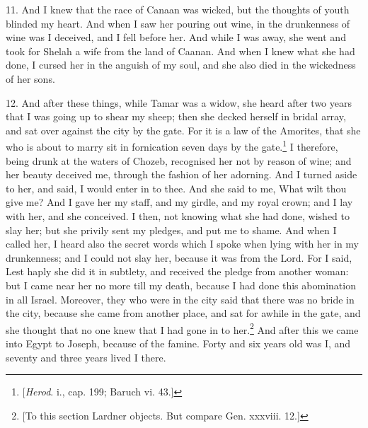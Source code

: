 11. And I knew that the race of Canaan was wicked, but the thoughts of youth blinded my heart. And when I saw her pouring out wine, in the drunkenness of wine was I deceived, and I fell before her. And while I was away, she went and took for Shelah a wife from the land of Caanan. And when I knew what she had done, I cursed her in the anguish of my soul, and she also died in the wickedness of her sons.

12. And after these things, while Tamar was a widow, she heard after two years that I was going up to shear my sheep; then she decked herself in bridal array, and sat over against the city by the gate. For it is a law of the Amorites, that she who is about to marry sit in fornication seven days by the gate.\footnote{[\emph{Herod}. i., cap. 199; Baruch vi. 43.]} I therefore, being drunk at the waters of Chozeb, recognised her not by reason of wine; and her beauty deceived me, through the fashion of her adorning. And I turned aside to her, and said, I would enter in to thee. And she said to me, What wilt thou give me? And I gave her my staff, and my girdle, and my royal crown; and I lay with her, and she conceived. I then, not knowing what she had done, wished to slay her; but she privily sent my pledges, and put me to shame. And when I called her, I heard also the secret words which I spoke when lying with her in my drunkenness; and I could not slay her, because it was from the Lord. For I said, Lest haply she did it in subtlety, and received the pledge from another woman: but I came near her no more till my death, because I had done this abomination in all Israel. Moreover, they who were in the city said that there was no bride in the city, because she came from another place, and sat for awhile in the gate, and she thought that no one knew that I had gone in to her.\footnote{[To this section Lardner objects. But compare Gen. xxxviii. 12.]} And after this we came into Egypt to Joseph, because of the famine. Forty and six years old was I, and seventy and three years lived I there.

